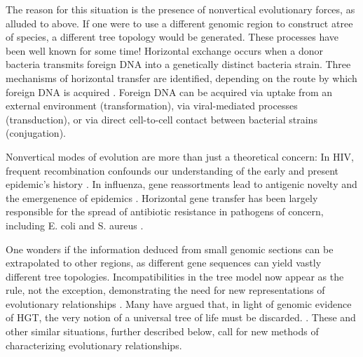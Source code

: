 The reason for this situation is the presence of nonvertical evolutionary forces, as alluded to above.
If one were to use a different genomic region to construct atree of species, a different tree topology would be generated.
These processes have been well known for some time!
Horizontal exchange occurs when a donor bacteria transmits foreign DNA into a genetically distinct bacteria strain.
Three mechanisms of horizontal transfer are identified, depending on the route by which foreign DNA is acquired \cite{Ochman:2000dr}.
Foreign DNA can be acquired via uptake from an external environment (transformation), via viral-mediated processes (transduction), or via direct cell-to-cell contact between bacterial strains (conjugation).



Nonvertical modes of evolution are more than just a theoretical concern:
In HIV, frequent recombination confounds our understanding of the early and present epidemic’s history \kje{[cite]}.
In influenza, gene reassortments lead to antigenic novelty and the emergenence of epidemics \kje{[cite]}.
Horizontal gene transfer has been largely responsible for the spread of antibiotic resistance in pathogens of concern, including E. coli and S. aureus \kje{[cite]}.

One wonders if the information deduced from small genomic sections can be extrapolated to other regions, as different gene sequences can yield vastly different tree topologies.
Incompatibilities in the tree model now appear as the rule, not the exception, demonstrating the need for new representations of evolutionary relationships \autocite{Doolittle:1999,Doolittle:2006}.
Many have argued that, in light of genomic evidence of HGT, the very notion of a universal tree of life must be discarded. .
These and other similar situations, further described below, call for new methods of characterizing evolutionary relationships.

